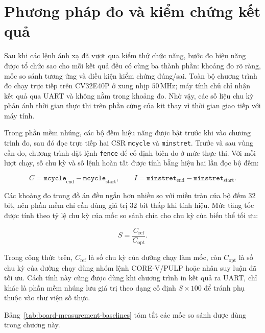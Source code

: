\documentclass[../DoAn.tex]{subfiles}
\begin{document}
\section{Phương pháp đo và kiểm chứng kết quả}
\label{sec:phuong-phap-do-board}

Sau khi các lệnh ánh xạ đã vượt qua kiểm thử chức năng, bước đo hiệu năng được tổ chức sao cho mỗi kết quả đều có cùng ba thành phần: khoảng đo rõ ràng, mốc so sánh tương ứng và điều kiện kiểm chứng đúng/sai. Toàn bộ chương trình đo chạy trực tiếp trên CV32E40P ở xung nhịp \(50\,\mathrm{MHz}\); máy tính chủ chỉ nhận kết quả qua UART và không nằm trong khoảng đo. Nhờ vậy, các số liệu chu kỳ phản ánh thời gian thực thi trên phần cứng của kit thay vì thời gian giao tiếp với máy tính.

Trong phần mềm nhúng, các bộ đếm hiệu năng được bật trước khi vào chương trình đo, sau đó đọc trực tiếp hai CSR \texttt{mcycle} và \texttt{minstret}. Trước và sau vùng cần đo, chương trình đặt lệnh \texttt{fence} để cố định biên đo ở mức thực thi. Với mỗi lượt chạy, số chu kỳ và số lệnh hoàn tất được tính bằng hiệu hai lần đọc bộ đếm:

\[
    C = \texttt{mcycle}_{\mathrm{end}} - \texttt{mcycle}_{\mathrm{start}}, \qquad
    I = \texttt{minstret}_{\mathrm{end}} - \texttt{minstret}_{\mathrm{start}}.
\]

Các khoảng đo trong đồ án đều ngắn hơn nhiều so với miền tràn của bộ đếm 32 bit, nên phần mềm chỉ cần dùng giá trị 32 bit thấp khi tính hiệu. Mức tăng tốc được tính theo tỷ lệ chu kỳ của mốc so sánh chia cho chu kỳ của biến thể tối ưu:

\[
    S = \frac{C_{\mathrm{ref}}}{C_{\mathrm{opt}}}.
\]

Trong công thức trên, \(C_{\mathrm{ref}}\) là số chu kỳ của đường chạy làm mốc, còn \(C_{\mathrm{opt}}\) là số chu kỳ của đường chạy dùng nhóm lệnh CORE-V/PULP hoặc nhân suy luận đã tối ưu. Cách tính này cũng được dùng khi chương trình in kết quả ra UART, chỉ khác là phần mềm nhúng lưu giá trị theo dạng cố định \(S \times 100\) để tránh phụ thuộc vào thư viện số thực.

Bảng~\ref{tab:board-measurement-baselines} tóm tắt các mốc so sánh được dùng trong chương này.
\end{document}
